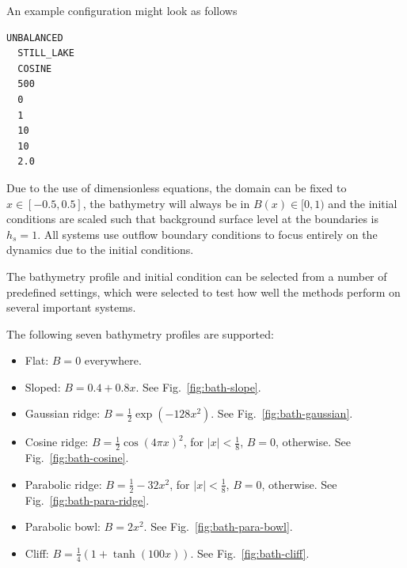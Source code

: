 An example configuration might look as follows

\begin{lstlisting}[caption=Configuration file]
  UNBALANCED
  STILL_LAKE
  COSINE
  500
  0
  1
  10
  10
  2.0
\end{lstlisting}

Due to the use of dimensionless equations, the domain can be fixed to $x \in [-0.5, 0.5]$, the bathymetry will always be in $B(x) \in [0,1)$ and the initial conditions are scaled such that background surface level at the boundaries is $h_s = 1$. All systems use outflow boundary conditions to focus entirely on the dynamics due to the initial conditions.

The bathymetry profile and initial condition can be selected from a number of predefined settings, which were selected to test how well the methods perform on several important systems.

The following seven bathymetry profiles are supported:

\begin{itemize}
  \item Flat: $B = 0$ everywhere.
  \item Sloped: $B = 0.4 + 0.8x$. See Fig.~\ref{fig:bath-slope}.
  \item Gaussian ridge: $B = \frac{1}{2} \exp (-128 x^2)$. See Fig.~\ref{fig:bath-gaussian}.
  \item Cosine ridge: $B = \frac{1}{2} \cos(4\pi x)^2$, for $|x| < \frac{1}{8}$, $B = 0$, otherwise. See Fig.~\ref{fig:bath-cosine}.
  \item Parabolic ridge: $B = \frac{1}{2} - 32x^2$, for $|x| < \frac{1}{8}$, $B = 0$, otherwise. See Fig.~\ref{fig:bath-para-ridge}.
  \item Parabolic bowl: $B = 2 x^2$. See Fig.~\ref{fig:bath-para-bowl}.
  \item Cliff: $B = \frac{1}{4} (1 + \tanh (100 x))$. See Fig.~\ref{fig:bath-cliff}.
\end{itemize}

